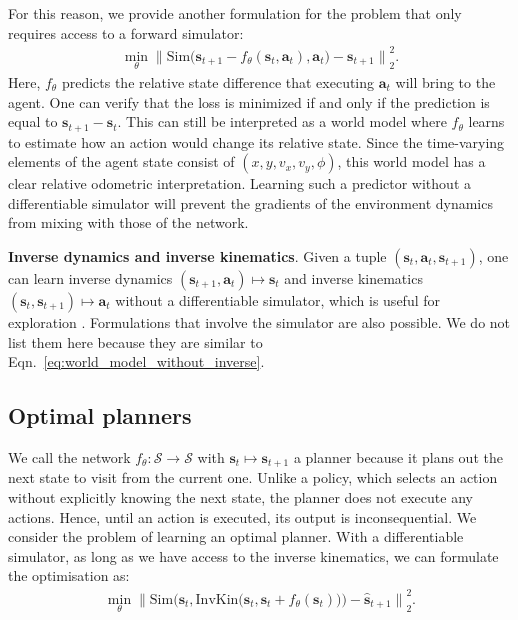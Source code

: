 For this reason, we provide another formulation for the problem that only requires access to a forward simulator:
\begin{equation} \label{eq:world_model_without_inverse}
\begin{aligned}
\min_\theta {\Big\lVert \text{Sim} \big(\mathbf{s}_{t+1} - f_\theta(\mathbf{s}_t, \mathbf{a}_t), \mathbf{a}_t \big) - \mathbf{s}_{t + 1} \Big\rVert}_2^2.
\end{aligned}
\end{equation}
Here, $f_\theta$ predicts the relative state difference that executing $\mathbf{a}_t$ will bring to the agent. One can verify that the loss is minimized if and only if the prediction is equal to $\mathbf{s}_{t+1} - \mathbf{s}_t$. This can still be interpreted as a world model where $f_\theta$ learns to estimate how an action would change its relative state. Since the time-varying elements of the agent state consist of $(x, y, v_x, v_y, \phi)$, this world model has a clear relative odometric interpretation. Learning such a predictor without a differentiable simulator will prevent the gradients of the environment dynamics from mixing with those of the network.

\textbf{Inverse dynamics and inverse kinematics}. Given a tuple $(\mathbf{s}_t, \mathbf{a}_t, \mathbf{s}_{t + 1})$, one can learn inverse dynamics $(\mathbf{s}_{t+1}, \mathbf{a}_t) \mapsto \mathbf{s}_t$ and inverse kinematics $(\mathbf{s}_{t}, \mathbf{s}_{t+1}) \mapsto \mathbf{a}_t$ without a differentiable simulator, which is useful for exploration \cite{pathak2017curiosity}. Formulations that involve the simulator are also possible. We do not list them here because they are similar to Eqn.~\ref{eq:world_model_without_inverse}.

\subsection{Optimal planners}
\label{subsection: optimal_planners}

We call the network $f_\theta: \mathcal{S} \rightarrow \mathcal{S}$ with $\mathbf{s}_t \mapsto \mathbf{s}_{t+1}$ a planner because it plans out the next state to visit from the current one. Unlike a policy, which selects an action without explicitly knowing the next state, the planner does not execute any actions. Hence, until an action is executed, its output is inconsequential. We consider the problem of learning an optimal planner. With a differentiable simulator, as long as we have access to the inverse kinematics, we can formulate the optimisation as:
\begin{equation} \label{eq:optimal_planner}
\begin{aligned}
\min_\theta {\Big\lVert \text{Sim} \Big(\mathbf{s}_t, \text{InvKin}\big(\mathbf{s}_t, \mathbf{s}_t + f_\theta(\mathbf{s}_t) \big) \Big) - \hat{\mathbf{s}}_{t + 1} \Big\rVert}_2^2.
\end{aligned}
\end{equation}

